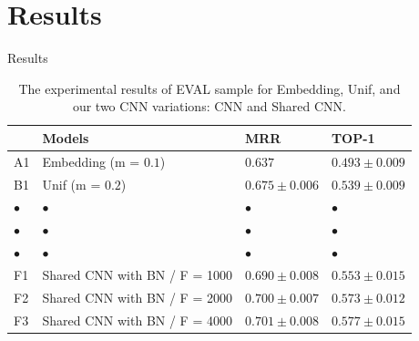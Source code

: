 \documentclass{beamer}
\begin{document}
    \section{Results}
    \begin{frame}{Results}
    
        \begin{table}[!b]
\footnotesize
\begin{tabularx}{\textwidth}{XXXX}
 \toprule
 & \textbf{Models} & \textbf{MRR} & \textbf{TOP-1}\\
 \toprule
 A1 & Embedding (m = $0.1$) & $0.637$& $0.493 \pm 0.009$\\
 
 \bottomrule
 
 B1 & Unif (m = $0.2$) & $0.675 \pm 0.006$ & $0.539 \pm 0.009$\\
 
 \bottomrule
 
 $\bullet$ & $\bullet$ & $\bullet$ & $\bullet$\\
 
 $\bullet$ & $\bullet$ & $\bullet$ & $\bullet$\\
 
 $\bullet$ & $\bullet$ & $\bullet$ & $\bullet$\\
 
 \bottomrule

 F1 & Shared CNN with BN / F = 1000 & $0.690 \pm 0.008$ & $0.553 \pm 0.015$\\
 
 F2 & Shared CNN with BN / F = 2000 & $0.700 \pm 0.007$ & $0.573 \pm 0.012$\\
 
 F3 & Shared CNN with BN / F = 4000 & $0.701 \pm 0.008$ & $0.577 \pm 0.015$\\
 
\bottomrule
\end{tabularx}
\caption{The experimental results of EVAL sample for Embedding, Unif, and our two CNN variations: CNN and Shared CNN. }
\label{table:resultados}
\end{table}
        
    \end{frame}
    
\end{document}
